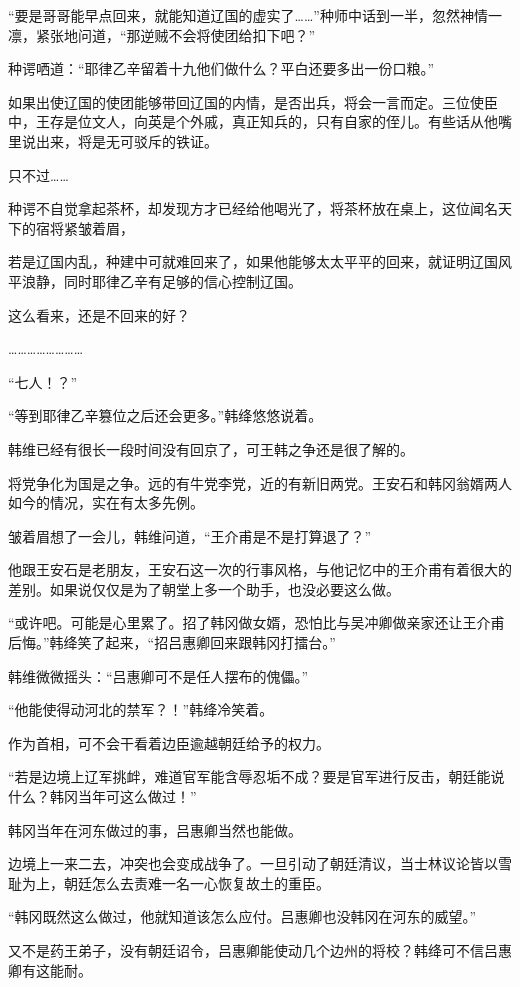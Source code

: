 “要是哥哥能早点回来，就能知道辽国的虚实了……”种师中话到一半，忽然神情一凛，紧张地问道，“那逆贼不会将使团给扣下吧？”

种谔哂道：“耶律乙辛留着十九他们做什么？平白还要多出一份口粮。”

如果出使辽国的使团能够带回辽国的内情，是否出兵，将会一言而定。三位使臣中，王存是位文人，向英是个外戚，真正知兵的，只有自家的侄儿。有些话从他嘴里说出来，将是无可驳斥的铁证。

只不过……

种谔不自觉拿起茶杯，却发现方才已经给他喝光了，将茶杯放在桌上，这位闻名天下的宿将紧皱着眉，

若是辽国内乱，种建中可就难回来了，如果他能够太太平平的回来，就证明辽国风平浪静，同时耶律乙辛有足够的信心控制辽国。

这么看来，还是不回来的好？

……………………

“七人！？”

“等到耶律乙辛篡位之后还会更多。”韩绛悠悠说着。

韩维已经有很长一段时间没有回京了，可王韩之争还是很了解的。

将党争化为国是之争。远的有牛党李党，近的有新旧两党。王安石和韩冈翁婿两人如今的情况，实在有太多先例。

皱着眉想了一会儿，韩维问道，“王介甫是不是打算退了？”

他跟王安石是老朋友，王安石这一次的行事风格，与他记忆中的王介甫有着很大的差别。如果说仅仅是为了朝堂上多一个助手，也没必要这么做。

“或许吧。可能是心里累了。招了韩冈做女婿，恐怕比与吴冲卿做亲家还让王介甫后悔。”韩绛笑了起来，“招吕惠卿回来跟韩冈打擂台。”

韩维微微摇头：“吕惠卿可不是任人摆布的傀儡。”

“他能使得动河北的禁军？！”韩绛冷笑着。

作为首相，可不会干看着边臣逾越朝廷给予的权力。

“若是边境上辽军挑衅，难道官军能含辱忍垢不成？要是官军进行反击，朝廷能说什么？韩冈当年可这么做过！”

韩冈当年在河东做过的事，吕惠卿当然也能做。

边境上一来二去，冲突也会变成战争了。一旦引动了朝廷清议，当士林议论皆以雪耻为上，朝廷怎么去责难一名一心恢复故土的重臣。

“韩冈既然这么做过，他就知道该怎么应付。吕惠卿也没韩冈在河东的威望。”

又不是药王弟子，没有朝廷诏令，吕惠卿能使动几个边州的将校？韩绛可不信吕惠卿有这能耐。

